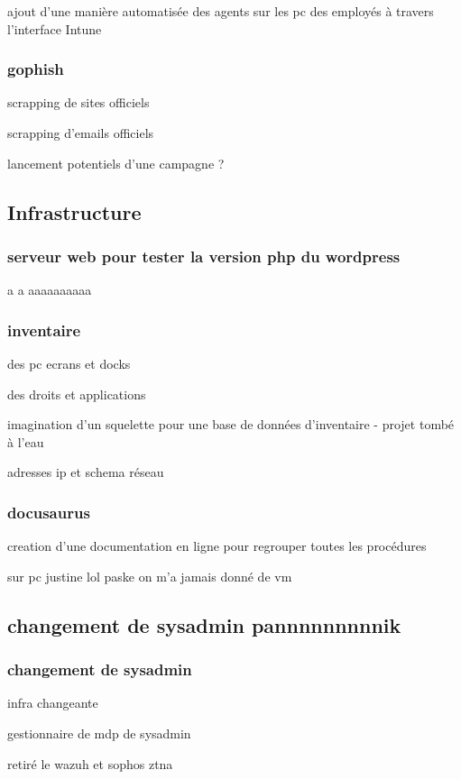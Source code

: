 ajout d'une manière automatisée des agents sur les pc des employés à travers l'interface Intune

\subsubsection{gophish}
scrapping de sites officiels

scrapping d'emails officiels

lancement potentiels d'une campagne ?


\subsection{Infrastructure}
\subsubsection{serveur web pour tester la version php du wordpress}
a   a   aaaaaaaaaa

\subsubsection{inventaire}
des pc ecrans et docks

des droits et applications

imagination d'un squelette pour une base de données d'inventaire - projet tombé à l'eau

adresses ip et schema réseau

\subsubsection{docusaurus}
creation d'une documentation en ligne pour regrouper toutes les procédures

sur pc justine lol paske on m'a jamais donné de vm

\subsection{changement de sysadmin pannnnnnnnnik}
\subsubsection{changement de sysadmin}
infra changeante

gestionnaire de mdp de sysadmin

retiré le wazuh et sophos ztna
